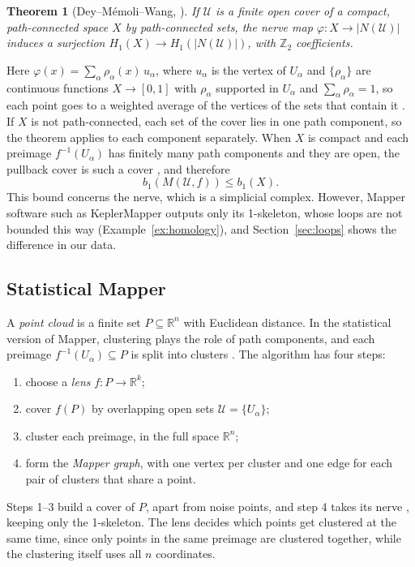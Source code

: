 \documentclass[11pt]{article}
\newcommand{\R}{\mathbb{R}}
\newcommand{\Z}{\mathbb{Z}}
\newtheorem{theorem}{Theorem}[section]
\theoremstyle{definition}
\theoremstyle{remark}
\begin{document}
\begin{theorem}[Dey--M\'emoli--Wang, {\cite[Thm.~8]{deymemoliwang2017}}]\label{thm:dmw}
If $\mathcal U$ is a finite open cover of a compact, path-connected space $X$ by path-connected sets, the nerve map $\varphi : X \to |N(\mathcal U)|$ induces a surjection $H_1(X) \to H_1(|N(\mathcal U)|)$, with $\Z_2$ coefficients.
\end{theorem}
Here $\varphi(x) = \sum_\alpha \rho_\alpha(x)\, u_\alpha$, where $u_\alpha$ is the vertex of $U_\alpha$ and $\{\rho_\alpha\}$ are continuous functions $X \to [0,1]$ with $\rho_\alpha$ supported in $U_\alpha$ and $\sum_\alpha \rho_\alpha = 1$, so each point goes to a weighted average of the vertices of the sets that contain it \parencite[Sec.~3.1]{deymemoliwang2017}. If $X$ is not path-connected, each set of the cover lies in one path component, so the theorem applies to each component separately.
When $X$ is compact and each preimage $f^{-1}(U_\alpha)$ has finitely many path components and they are open, the pullback cover is such a cover \parencite[Def.~14]{deymemoliwang2017}, and therefore \parencite[Thm.~18]{deymemoliwang2017}
\begin{equation}\label{eq:mapper-b1}
  b_1(M(\mathcal U, f)) \le b_1(X).
\end{equation}
This bound concerns the nerve, which is a simplicial complex. However, Mapper software such as KeplerMapper outputs only its 1-skeleton, whose loops are not bounded this way (Example~\ref{ex:homology}), and Section~\ref{sec:loops} shows the difference in our data.

\subsection{Statistical Mapper}
A \emph{point cloud} is a finite set $P \subseteq \R^n$ with Euclidean distance.
In the statistical version of Mapper, clustering plays the role of path components, and each preimage $f^{-1}(U_\alpha) \subseteq P$ is split into clusters \parencite{singh2007mapper}.
The algorithm has four steps:
\begin{enumerate}
  \item choose a \emph{lens} $f : P \to \R^k$;
  \item cover $f(P)$ by overlapping open sets $\mathcal U = \{U_\alpha\}$;
  \item cluster each preimage, in the full space $\R^n$;
  \item form the \emph{Mapper graph}, with one vertex per cluster and one edge for each pair of clusters that share a point.
\end{enumerate}
Steps 1--3 build a cover of $P$, apart from noise points, and step 4 takes its nerve \parencite{singh2007mapper}, keeping only the 1-skeleton.
The lens decides which points get clustered at the same time, since only points in the same preimage are clustered together, while the clustering itself uses all $n$ coordinates.
\end{document}
